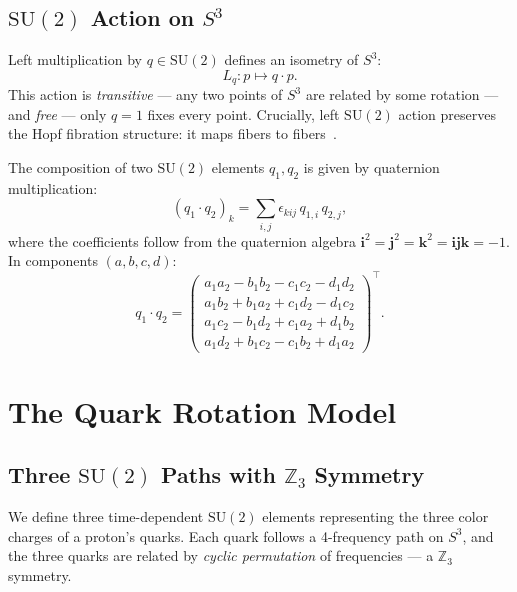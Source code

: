 \documentclass[12pt, a4paper]{article}
\theoremstyle{definition}
\theoremstyle{remark}
\newcommand{\Sthree}{S^3}
\newcommand{\SU}{\mathrm{SU}(2)}
\newcommand{\Z}{\mathbb{Z}}
\begin{document}
\subsection{$\SU$ Action on $\Sthree$}

Left multiplication by $q \in \SU$ defines an isometry of $\Sthree$:
\begin{equation}
  L_q : p \mapsto q \cdot p.
  \label{eq:left_action}
\end{equation}
This action is \emph{transitive} --- any two points of $\Sthree$ are related
by some rotation --- and \emph{free} --- only $q = 1$ fixes every point.
Crucially, left $\SU$ action preserves the Hopf fibration structure:
it maps fibers to fibers~\cite{urbantke2003,nakahara2003}.

The composition of two $\SU$ elements $q_1, q_2$ is given by quaternion
multiplication:
\begin{equation}
  (q_1 \cdot q_2)_k = \sum_{i,j} \epsilon_{kij}\, q_{1,i}\, q_{2,j},
  \label{eq:su2_mul}
\end{equation}
where the coefficients follow from the quaternion algebra
$\mathbf{i}^2 = \mathbf{j}^2 = \mathbf{k}^2 = \mathbf{ijk} = -1$.
In components $(a, b, c, d)$:
\begin{equation}
  q_1 \cdot q_2 = \begin{pmatrix}
    a_1 a_2 - b_1 b_2 - c_1 c_2 - d_1 d_2 \\
    a_1 b_2 + b_1 a_2 + c_1 d_2 - d_1 c_2 \\
    a_1 c_2 - b_1 d_2 + c_1 a_2 + d_1 b_2 \\
    a_1 d_2 + b_1 c_2 - c_1 b_2 + d_1 a_2
  \end{pmatrix}^{\!\!\top}\!.
  \label{eq:quat_mul}
\end{equation}


\section{The Quark Rotation Model}
\label{sec:quarks}

\subsection{Three $\SU$ Paths with $\Z_3$ Symmetry}

We define three time-dependent $\SU$ elements representing the three color
charges of a proton's quarks. Each quark follows a 4-frequency path on
$\Sthree$, and the three quarks are related by \emph{cyclic permutation}
of frequencies --- a $\Z_3$ symmetry.
\end{document}
